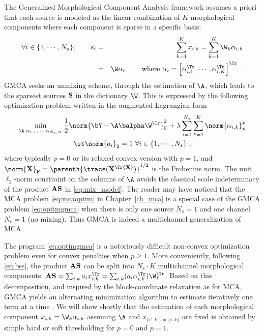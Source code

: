 The Generalized Morphological Component Analysis framework assumes a priori that each source is modeled as the linear combination of $K$ morphological components where each component is sparse in a specific basis:
\begin{eqnarray}
\label{eq:sourcecomponents}
\forall i \in \{1,\cdots,N_s\}; \qquad s_i & = & \sum_{k=1}^K x_{i,k} = \sum_{k=1}^K \W_k\alpha_{i,k} \\
& = & \W \alpha_i \qquad \mbox{ where } \alpha_i =  \left[\alpha_{i,1}^\Tr,\cdots,\alpha_{i,K}^\Tr \right]^\Tr ~. \nonumber
\end{eqnarray}
GMCA seeks an unmixing scheme, through the estimation of $\A$, which leads to the sparsest sources $\bf S$ in the dictionary $\W$. This is expressed by the following optimization problem written in the augmented Lagrangian form
\begin{multline}
\label{eq:optimgmca}
\min_{{\A},\alpha_{1,1},\cdots,\alpha_{N_s,K}} \frac{1}{2}\norm{\bY - {\A}\balpha\W^\Tr}^2_{\mathrm{F}} + \lambda \sum_{i=1}^{N_s} \sum_{k=1}^K \norm{\alpha_{i,k}}_p^p \\ \st \norm{a_i}_2 = 1 ~ \forall i \in \{1,\cdots,N_s\} ~,
\end{multline} 
where typically $p=0$ or its relaxed convex version with $p=1$, and $\norm{{\bf X}}_{\mathrm{F}}=\parenth{\trace({\bf X}^\Tr{\bf X})}^{1/2}$ is the Frobenius norm. The unit $\ell_2$-norm constraint on the columns of $\A$ avoids the classical scale indeterminacy of the product $\bf AS$ in \eqref{eq:mix_model}. The reader may have noticed that the MCA problem \eqref{eq:mcaoptim} in Chapter~\ref{ch_mca} is a special case of the GMCA problem \eqref{eq:optimgmca} when there is only one source $N_s=1$ and one channel $N_c=1$ (no mixing). Thus GMCA is indeed a multichannel generalization of MCA. 

The program \eqref{eq:optimgmca} is a notoriously difficult non-convex optimization problem even for convex penalties when $p \geq 1$. More conveniently, following \eqref{eq:bss}, the product $\bf AS$ can be split into $N_s \cdot K$ multichannel morphological components: ${\bf AS} = \sum_{i,k} a_i x_{i,k}^\Tr = \sum_{i,k} (a_i \alpha_{i,k}^\Tr) \W_k^\Tr$. Based on this decomposition, and inspired by the block-coordinate relaxation as for MCA, GMCA yields an alternating minimization algorithm to estimate iteratively one term at a time \citep{starck:bobin07}. We will show shortly that the estimation of each morphological component $x_{i,k} = \W_k\alpha_{i,k}$ assuming $\A$ and $x_{\{i',k'\} \neq \{i,k\} }$ are fixed is obtained by simple hard or soft thresholding for $p=0$ and $p=1$.

